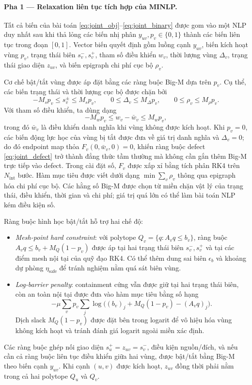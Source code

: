 \begin{appendices}
    \paragraph*{Pha 1 — Relaxation liên tục tích hợp của MINLP.}
    Tất cả biến của bài toán \eqref{eq:joint_obj}--\eqref{eq:joint_binary} được gom
    vào một NLP duy nhất sau khi thả lỏng các biến nhị phân
    $y_{uv},p_v\in\{0,1\}$ thành các biến liên tục trong đoạn $[0,1]$. Vector biến
    quyết định gồm luồng cạnh $y_{uv}$, biến kích hoạt vùng $p_v$, trạng thái biên
    $s_v^-,s_v^+$, tham số điều khiển $w_v$, thời lượng vùng $\Delta_v$, trạng thái
    giao diện $z_{uv}$, và biến epigraph chi phí cục bộ $\rho_v$.

    Cơ chế bật/tắt vùng được áp đặt bằng các ràng buộc Big-M dựa trên $p_v$. Cụ
    thể, các biến trạng thái và thời lượng cục bộ được chặn bởi
    \[
        -M_s p_v \le s_v^\pm \le M_s p_v,\qquad
        0\le \Delta_v \le M_\Delta p_v,\qquad
        0\le \rho_v \le M_\rho p_v.
    \]
    Với tham số điều khiển, ta dùng dạng
    \[
        -M_w p_v \le w_v-\bar w_v \le M_w p_v,
    \]
    trong đó $\bar w_v$ là điều khiển danh nghĩa khi vùng không được kích hoạt. Khi
    $p_v=0$, các biến động lực học của vùng bị tắt được đưa về giá trị danh nghĩa
    và $\Delta_v=0$; do đó endpoint map thỏa $F_v(0,\bar w_v,0)=0$, khiến ràng buộc
    defect \eqref{eq:joint_defect} trở thành đẳng thức tầm thường mà không cần gắn
    thêm Big-M trực tiếp vào defect. Trong cài đặt số, $F_v$ được xấp xỉ bằng tích
    phân RK4 trên $N_{\text{int}}$ bước. Hàm mục tiêu được viết dưới dạng $\min
        \sum_v \rho_v$ thông qua epigraph hóa chi phí cục bộ. Các hằng số Big-M được
    chọn từ miền chặn vật lý của trạng thái, điều khiển, thời gian và chi phí; giá
    trị quá lớn có thể làm bài toán NLP kém điều kiện số.

    Ràng buộc hình học bật/tắt hỗ trợ hai chế độ:
    \begin{itemize}
        \item \emph{Mesh-point hard constraint}: với polytope
              $Q_v=\{q:A_vq\le b_v\}$, ràng buộc
              $A_vq\le b_v+M_Q(1-p_v)$ được áp tại hai trạng thái biên $s_v^-,s_v^+$ và
              tại các điểm mesh nội tại của quỹ đạo RK4. Có thể thêm dung sai biên
              $\epsilon_b$ và khoảng dự phòng $\eta_{\text{safe}}$ để tránh nghiệm nằm quá
              sát biên vùng.
        \item \emph{Log-barrier penalty}: containment cứng vẫn được giữ tại hai
              trạng thái biên, còn an toàn nội tại được đưa vào hàm mục tiêu bằng số hạng
              \[
                  -\mu \sum_v p_v\sum_{j}
                  \log\!\bigl((b_v)_j+M_Q(1-p_v)-(A_vq)_j\bigr).
              \]
              Dịch slack $M_Q(1-p_v)$ được đặt bên trong logarit để vô hiệu hóa vùng không
              kích hoạt và tránh đánh giá logarit ngoài miền xác định.
    \end{itemize}
    Các ràng buộc ghép nối giao diện $s_u^+=z_{uv}=s_v^-$, điều kiện nguồn/đích, và
    nếu cần cả ràng buộc liên tục điều khiển giữa hai vùng, được bật/tắt bằng Big-M
    theo biến cạnh $y_{uv}$. Khi cạnh $(u,v)$ được kích hoạt, $z_{uv}$ đồng thời
    phải nằm trong cả hai polytope $Q_u$ và $Q_v$.


\end{appendices}
